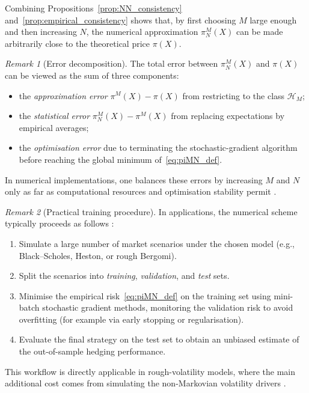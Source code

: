 \documentclass[12pt,a4paper]{article}
\theoremstyle{definition}
\theoremstyle{plain}
\theoremstyle{remark}
\newtheorem{remark}{Remark}[section]
\theoremstyle{plain}
\begin{document}
Combining Propositions~\ref{prop:NN_consistency} and~\ref{prop:empirical_consistency} shows that, by first choosing $M$ large enough and then increasing $N$, the numerical approximation $\pi^{M}_N(X)$ can be made arbitrarily close to the theoretical price $\pi(X)$.

\begin{remark}[Error decomposition]\label{rem:error_decomposition}
The total error between $\pi^{M}_N(X)$ and $\pi(X)$ can be viewed as the sum of three components:
\begin{itemize}
    \item the \emph{approximation error} $\pi^{M}(X)-\pi(X)$ from restricting to the class $\mathcal H_M$;
    \item the \emph{statistical error} $\pi^{M}_N(X)-\pi^{M}(X)$ from replacing expectations by empirical averages;
    \item the \emph{optimisation error} due to terminating the stochastic-gradient algorithm before reaching the global minimum of~\eqref{eq:piMN_def}.
\end{itemize}
In numerical implementations, one balances these errors by increasing $M$ and $N$ only as far as computational resources and optimisation stability permit \cite{Buehler2019DeepHedging,HighamHigham2019DeepLearning}.
\end{remark}

\begin{remark}[Practical training procedure]\label{rem:practical_training}
In applications, the numerical scheme typically proceeds as follows \cite{Buehler2019DeepHedging,Horvath2021DeepRough}:
\begin{enumerate}
    \item Simulate a large number of market scenarios under the chosen model (e.g., Black--Scholes, Heston, or rough Bergomi).
    \item Split the scenarios into \emph{training}, \emph{validation}, and \emph{test} sets.
    \item Minimise the empirical risk~\eqref{eq:piMN_def} on the training set using mini-batch stochastic gradient methods, monitoring the validation risk to avoid overfitting (for example via early stopping or regularisation).
    \item Evaluate the final strategy on the test set to obtain an unbiased estimate of the out-of-sample hedging performance.
\end{enumerate}
This workflow is directly applicable in rough-volatility models, where the main additional cost comes from simulating the non-Markovian volatility drivers \cite{Horvath2021DeepRough}.
\end{remark}
\end{document}
